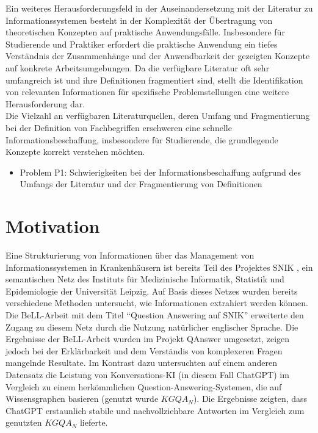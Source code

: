 Ein weiteres Herausforderungsfeld in der Auseinandersetzung mit der Literatur zu Informationssystemen besteht in der Komplexität der Übertragung von theoretischen Konzepten auf praktische Anwendungsfälle.
Insbesondere für Studierende und Praktiker erfordert die  praktische Anwendung ein tiefes Verständnis der Zusammenhänge und der Anwendbarkeit der gezeigten Konzepte auf konkrete Arbeitsumgebungen. 
Da die verfügbare Literatur oft sehr umfangreich ist und ihre Definitionen fragmentiert sind, stellt die Identifikation von relevanten Informationen für spezifische Problemstellungen eine weitere Herausforderung dar.\\

Die Vielzahl an verfügbaren Literaturquellen, deren Umfang und Fragmentierung bei der Definition von Fachbegriffen
erschweren eine schnelle Informationsbeschaffung, insbesondere für Studierende, die grundlegende Konzepte korrekt verstehen möchten. \\

\begin{itemize}
  \item Problem P1: Schwierigkeiten bei der Informationsbeschaffung aufgrund des Umfangs der Literatur und der Fragmentierung von Definitionen
\end{itemize}

\section{Motivation}

Eine Strukturierung von Informationen über das Management von Informationssystemen in Krankenhäusern ist bereits Teil des Projektes SNIK \citep{semantischesnetz, domaene}, 
ein semantischen Netz des Instituts für Medizinische Informatik, Statistik und Epidemiologie der Universität Leipzig.
Auf Basis dieses Netzes wurden bereits verschiedene Methoden untersucht, wie Informationen extrahiert werden können.\\

Die BeLL-Arbeit mit dem Titel \enquote{Question Answering auf SNIK} \citep{hannesbell} erweiterte den Zugang zu diesem Netz durch die Nutzung natürlicher englischer Sprache. 
Die Ergebnisse der BeLL-Arbeit wurden im Projekt QAnswer \citep{qanswer} umgesetzt, zeigen jedoch bei der Erklärbarkeit und dem Verständis von komplexeren Fragen mangelnde Resultate. 
Im Kontrast dazu untersuchten \citet{chatgpt_qas} auf einem anderen Datensatz die Leistung von Konversations-KI (in diesem Fall ChatGPT) im Vergleich zu einem herkömmlichen Question-Answering-Systemen, die auf Wissensgraphen basieren (genutzt wurde $KGQA_N$). 
Die Ergebnisse zeigten, dass ChatGPT erstaunlich stabile und nachvollziehbare Antworten im Vergleich zum genutzten $KGQA_N$ lieferte.\\

